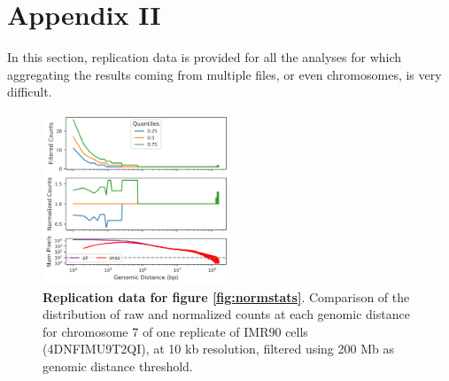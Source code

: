 \graphicspath{{chapters/91_appendix_ii/images}}
\chapter*{Appendix II}\label{chap:appendixII}


In this section, replication data is provided for all the analyses for which aggregating the results coming from multiple files, or even chromosomes, is very difficult.

\begin{figure}[h]
  \centering
  \includegraphics[width=0.5\textwidth]{normalization_rep1.png}
  \caption{\textbf{Replication data for figure \ref{fig:normstats}}. Comparison of the distribution of raw and normalized counts at each genomic distance for chromosome 7 of one replicate of IMR90 cells (4DNFIMU9T2QI), at 10 kb resolution, filtered using 200 Mb as genomic distance threshold.} 
\end{figure}

